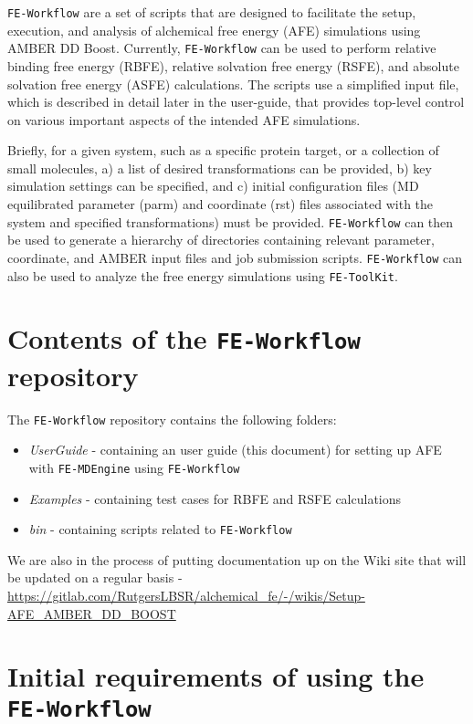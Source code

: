 \documentclass[11pt,letterpaper,titlepage]{article}
\newcommand{\addb}{\texttt{FE-MDEngine}}
\newcommand{\tk}{\texttt{FE-ToolKit}}
\newcommand{\wf}{\texttt{FE-Workflow}}
\begin{document}
\wf{} are a set of scripts that are designed to 
facilitate the setup, execution, and analysis of alchemical 
free energy (AFE) simulations using AMBER DD Boost. Currently, 
\wf{} can be used to perform relative binding
free energy (RBFE), relative solvation free energy (RSFE), and 
absolute solvation free energy (ASFE) calculations. The scripts
use a
simplified input file, which is described in detail later in the 
user-guide, that provides top-level control on various important 
aspects of the intended AFE simulations. 

Briefly, for a given system, such as a specific protein target, or 
a collection of small molecules, 
a) a list of desired transformations can be provided, 
b) key simulation settings can be specified, and 
c) initial configuration files (MD equilibrated parameter (parm) and 
coordinate (rst) files associated with the system and
specified transformations) must be provided. 
\wf{} can then be used to generate a hierarchy of directories 
containing relevant parameter, coordinate, and AMBER input files 
and job submission scripts. 
\wf{} can also be used 
to analyze the free energy simulations using \tk{}.


\vspace{0.1cm}
\section{Contents of the \wf{} repository}
\vspace{0.1cm}

The \wf{} repository contains the following folders:
\begin{itemize}
	\item{\textit{UserGuide} - containing an user guide (this document) 
		for setting up AFE with \addb{} using \wf{}}
        \item{\textit{Examples} - containing test cases for RBFE and 
		RSFE calculations}
	\item{\textit{bin} - containing scripts related to \wf{}}
\end{itemize}


We are also in the process of putting documentation up on the Wiki site 
that will be updated on a regular basis
- \url{https://gitlab.com/RutgersLBSR/alchemical\_fe/-/wikis/Setup-AFE\_AMBER\_DD\_BOOST}


\vspace{0.1cm}
\section{Initial requirements of using the \wf{}}
\vspace{0.1cm}
\end{document}
